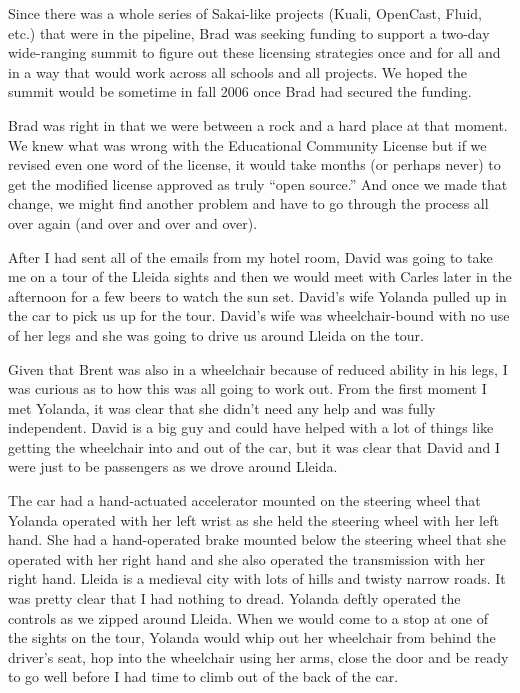 \documentclass[12pt]{book}
\begin{document}
Since there was a whole series of Sakai-like projects
(Kuali, OpenCast, Fluid, etc.) that were in the pipeline,
Brad was seeking funding to support a two-day wide-ranging
summit to figure out these licensing strategies once and
for all and in a way that would work across all schools and
all projects.  We hoped the summit would be sometime in
fall 2006 once Brad had secured the funding.

Brad was right in that we were between a rock
and a hard place at that moment.  We knew what was wrong with
the Educational Community License but if we revised even
one word of the license, it would take months
(or perhaps never) to get the modified license approved
as truly ``open source.''   And once we made that change,
we might find another problem and have to go through the
process all over again (and over and over and over).

After I had sent all of the emails from my hotel room, David was going
to take me on a tour of the Lleida sights and then we would meet
with Carles later in the afternoon for a few beers to watch the sun set.
David's wife Yolanda pulled up in the car to pick us
up for the tour.  David's wife was wheelchair-bound with no use of
her legs and she was going to drive us around Lleida on the tour.

Given that Brent was also in a wheelchair because of reduced ability
in his legs, I was curious as to how this was all going to work
out.  From the first moment I met Yolanda, it was clear that she
didn't need any help and was fully independent.  David is a big guy
and could have helped with a lot of things like getting the wheelchair
into and out of the car, but it was clear that
David and I were just to be passengers as we drove around
Lleida.

The car had a hand-actuated accelerator mounted on the steering
wheel that Yolanda operated with her left wrist as she held the steering
wheel with her left hand.  She had a hand-operated brake mounted below
the steering wheel that she operated with her right hand and she also
operated the transmission with her right hand.  Lleida is a medieval city
with lots of hills and twisty narrow roads.  It was pretty clear
that I had nothing to dread.   Yolanda deftly operated the controls
as we zipped around Lleida.  When we would come to a stop at one
of the sights on the tour, Yolanda would whip out her wheelchair from
behind the driver's seat, hop into the wheelchair using her arms,
close the door and be ready to go well before I had time to climb out of
the back of the car.
\end{document}
